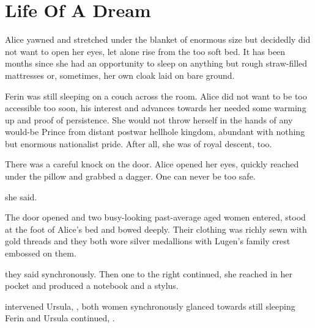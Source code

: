
\section{Life Of A Dream}

Alice yawned and stretched under the blanket of enormous size but decidedly did not want to open her eyes, let alone rise from the too soft bed. It has been months since she had an opportunity to sleep on anything but rough straw-filled mattresses or, sometimes, her own cloak laid on bare ground.

Ferin was still sleeping on a couch across the room. Alice did not want to be too accessible too soon, his interest and advances towards her needed some warming up and proof of persistence. She would not throw herself in the hands of any would-be Prince from distant postwar hellhole kingdom, abundant with nothing but enormous nationalist pride. After all, she was of royal descent, too.

There was a careful knock on the door. Alice opened her eyes, quickly reached under the pillow and grabbed a dagger. One can never be too safe.

 she said.

The door opened and two busy-looking past-average aged women entered, stood at the foot of Alice's bed and bowed deeply. Their clothing was richly sewn with gold threads and they both wore silver medallions with Lugen's family crest embossed on them.

 they said synchronously. Then one to the right continued,  she reached in her pocket and produced a notebook and a stylus. 

 intervened Ursula, , both women synchronously glanced towards still sleeping Ferin and Ursula continued, .

